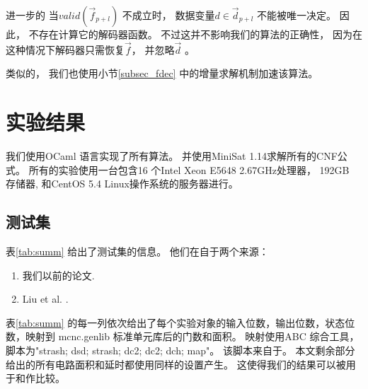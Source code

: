 进一步的
当$valid(\vec{f}_{p+l})$ 不成立时，
数据变量$d\in\vec{d}_{p+l}$ 不能被唯一决定。
因此，
不存在计算它的解码器函数。
不过这并不影响我们的算法的正确性，
因为在这种情况下解码器只需恢复$\vec{f}$，
并忽略$\vec{d}$ 。

类似的，
我们也使用小节\ref{subsec_fdec} 中的增量求解机制加速该算法。



\section{实验结果}\label{sec_exp}

我们使用OCaml 语言实现了所有算法。
并使用MiniSat 1.14求解所有的CNF公式。
所有的实验使用一台包含16 个Intel Xeon E5648 2.67GHz处理器，
192GB 存储器, 和CentOS 5.4 Linux操作系统的服务器进行。

\subsection{测试集}
表\ref{tab:summ} 给出了测试集的信息。
他们在自于两个来源：
\begin{enumerate}
 \item 我们以前的论文.
 \item Liu et al. .
\end{enumerate}

表\ref{tab:summ} 的每一列依次给出了每个实验对象的输入位数，输出位数，状态位数，映射到 mcnc.genlib 标准单元库后的门数和面积。
映射使用ABC 综合工具，
脚本为"strash; dsd; strash; dc2; dc2; dch; map"。
该脚本来自于。
本文剩余部分给出的所有电路面积和延时都使用同样的设置产生。
这使得我们的结果可以被用于和作比较。

